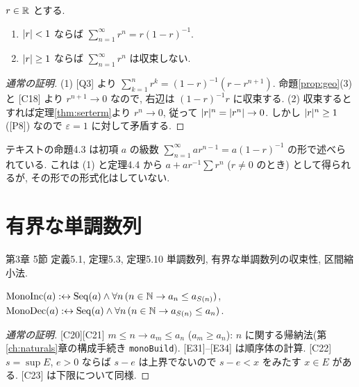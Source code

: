 \begin{prop}\label{prop:geoser}
  $r \in \mathbb{R}$ とする.
  \begin{enumerate}[label=(\arabic*)]
    \item $\lvert r\rvert < 1$ ならば $\sum_{n=1}^\infty r^n = r(1 - r)^{-1}$.
    \item $\lvert r\rvert \geq 1$ ならば $\sum_{n=1}^\infty r^n$ は収束しない.
  \end{enumerate}
\end{prop}
\begin{proof}[通常の証明]
  (1) [Q3] より $\sum_{k=1}^n r^k = (1-r)^{-1}(r - r^{n+1})$. 命題\ref{prop:geo}(3) と [C18] より $r^{n+1} \to 0$ なので, 右辺は $(1-r)^{-1} r$ に収束する. (2) 収束するとすれば定理\ref{thm:serterm}より $r^n \to 0$, 従って $\lvert r\rvert^n = \lvert r^n\rvert \to 0$. しかし $\lvert r\rvert^n \geq 1$ ([P8]) なので $\varepsilon = 1$ に対して矛盾する.
\end{proof}

テキストの命題4.3 は初項 $a$ の級数 $\sum_{n=1}^\infty a r^{n-1} = a(1-r)^{-1}$ の形で述べられている. これは (1) と定理4.4 から $a + a r^{-1}\sum r^n$ ($r \neq 0$ のとき) として得られるが, その形での形式化はしていない.

\section{有界な単調数列}

\begin{textref}{第3章 5節 定義5.1, 定理5.3, 定理5.10}
  単調数列, 有界な単調数列の収束性, 区間縮小法.
\end{textref}

\begin{dfn}[テキスト定義5.1]
  $\mathrm{MonoInc}(a) :\leftrightarrow \mathrm{Seq}(a) \land \forall n\,(n \in \mathbb{N} \to a_n \leq a_{S(n)})$, \quad $\mathrm{MonoDec}(a) :\leftrightarrow \mathrm{Seq}(a) \land \forall n\,(n \in \mathbb{N} \to a_{S(n)} \leq a_n)$.
\end{dfn}

\begin{lem}\label{lem:mono}
\end{lem}
\begin{proof}[通常の証明]
  [C20][C21] $m \leq n \to a_m \leq a_n$ ($a_m \geq a_n$): $n$ に関する帰納法(第\ref{ch:naturals}章の構成手続き \texttt{monoBuild}). [E31]--[E34] は順序体の計算. [C22] $s = \sup E$, $e > 0$ ならば $s - e$ は上界でないので $s - e < x$ をみたす $x \in E$ がある. [C23] は下限について同様.
\end{proof}

